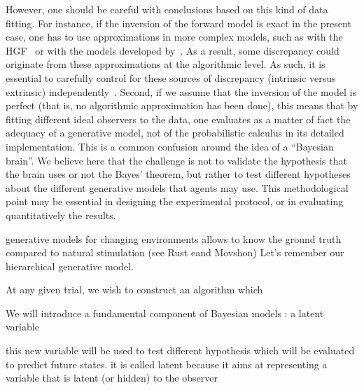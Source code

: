\documentclass[12pt,english]{article}%
\newcommand{\citep}[1]{\parencite{#1}}
\newcommand{\citet}[1]{\textcite{#1}}
\begin{document}
%


However, one should be careful with conclusions based on this kind of data fitting.
For instance, if the inversion of the forward model is exact in the present case,
one has to use approximations in more complex models,
such as with the HGF~\citep{Mathys11}
or with the models developed by~\citet{Wilson13,Wilson18}.
As a result, some discrepancy could originate from these approximations
at the algorithmic level.
As such, it is essential to carefully control for these sources of discrepancy (intrinsic versus extrinsic) independently~\citep{Beck12}.
Second, if we assume that the inversion of the model is perfect
(that is, no algorithmic approximation has been done),
this means that by fitting different ideal observers
to the data, one evaluates as a matter of fact the adequacy of
a generative model, not of the probabilistic calculus in its detailed implementation.
This is a common confusion around the idea of a ``Bayesian brain''.
We believe here that the challenge is not to validate the hypothesis that the brain uses or not the Bayes' theorem,
but rather to test different hypotheses
about the different generative models
that agents may use.
This methodological point may be essential in designing the experimental protocol,
or in evaluating quantitatively the results.

generative models for changing environments allows to know the ground truth compared to natural stimulation (see Rust eand Movshon)%
Let's remember our hierarchical generative model.

At any given trial, we wish to construct an algorithm which

We will introduce a fundamental component of Bayesian models : a latent variable

this new variable will be used to test different hypothesis which will be evaluated to predict future states. it is called latent because it aims at representing a variable that is latent (or hidden) to the observer
\end{document}
